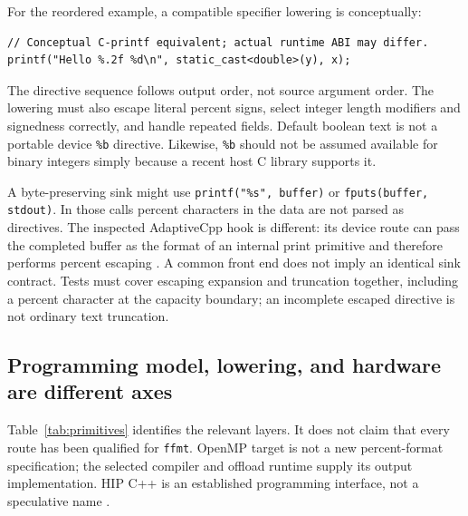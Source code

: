 \documentclass[11pt,letterpaper]{article}
\newcommand{\ffmt}{\texttt{ffmt}}
\begin{document}
For the reordered example, a compatible specifier lowering is conceptually:
\begin{lstlisting}
// Conceptual C-printf equivalent; actual runtime ABI may differ.
printf("Hello %.2f %d\n", static_cast<double>(y), x);
\end{lstlisting}
The directive sequence follows output order, not source argument order.
The lowering must also escape literal percent signs, select integer length
modifiers and signedness correctly, and handle repeated fields. Default
boolean text is not a portable device \texttt{\%b} directive. Likewise,
\texttt{\%b} should not be assumed available for binary integers simply because
a recent host C library supports it.

A byte-preserving sink might use \texttt{printf("\%s", buffer)} or
\texttt{fputs(buffer, stdout)}. In those calls percent characters in the data
are not parsed as directives. The inspected AdaptiveCpp hook is different:
its device route can pass the completed buffer as the format of an internal
print primitive and therefore performs percent escaping \cite{ffmt-source}.
A common front end does not imply an identical sink contract. Tests must cover
escaping expansion and truncation together, including a percent character at
the capacity boundary; an incomplete escaped directive is not ordinary
text truncation.

\subsection{Programming model, lowering, and hardware are different axes}

Table~\ref{tab:primitives} identifies the relevant layers. It does not claim
that every route has been qualified for \ffmt. OpenMP target is not a new
percent-format specification; the selected compiler and offload runtime
supply its output implementation. HIP C++ is an established programming
interface, not a speculative name \cite{hip}.
\end{document}
